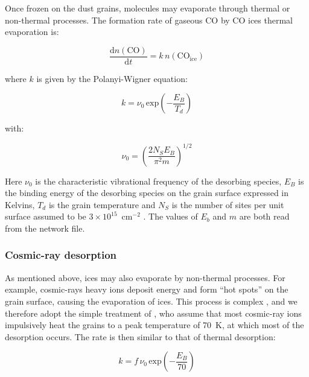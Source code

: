 \documentclass[a4paper,12pt]{article}
\newcommand{\conc}[1]{n(\mathrm{#1})}
\begin{document}
Once frozen on the dust grains, molecules may evaporate through
thermal or non-thermal processes. The formation rate of gaseous CO by
CO ices thermal evaporation is:

\begin{equation}
  \frac{\mathrm{d}\conc{CO}}{\mathrm{d}t} = k \, \conc{CO_{ice}}
\end{equation}

\noindent
where $k$ is given by the Polanyi-Wigner equation:

\begin{equation}
  k = \nu_{0} \, \mathrm{exp} \left( - \frac{E_{B}}{T_{d}} \right)
  \label{eq:thermal-desorption}
\end{equation}

\noindent
with:

\begin{equation}
  \nu_{0} = \left( \frac{2 N_{S} E_{B}}{\pi^2 m} \right)^{1/2}
  \label{eq:vibration-freq}
\end{equation}

\noindent
Here $\nu_{0}$ is the characteristic vibrational frequency of the
desorbing species, $E_{B}$ is the binding energy of the desorbing
species on the grain surface expressed in Kelvins, $T_{d}$ is the
grain temperature and $N_{S}$ is the number of sites per unit surface
assumed to be $3 \times 10^{15}$~cm$^{-2}$ \citep{Hasegawa92}. The
values of $E_{b}$ and $m$ are both read from the network file.

\subsubsection{Cosmic-ray desorption}
\label{sec:cosm-ray-desorpt}

As mentioned above, ices may also evaporate by non-thermal
processes. For example, cosmic-rays heavy ions deposit energy and form
``hot spots'' on the grain surface, causing the evaporation of
ices. This process is complex \citep[see e.g.][]{Bringa04}, and we
therefore adopt the simple treatment of \citet{Hasegawa93}, who assume
that most cosmic-ray ions impulsively heat the grains to a peak
temperature of 70~K, at which most of the desorption occurs. The rate
is then similar to that of thermal desorption:

\begin{equation}
  k = f \, \nu_{0} \, \mathrm{exp} \left( -\frac{E_{B}}{70} \right)
  \label{eq:cosmic-ray-desorption}
\end{equation}
\end{document}
